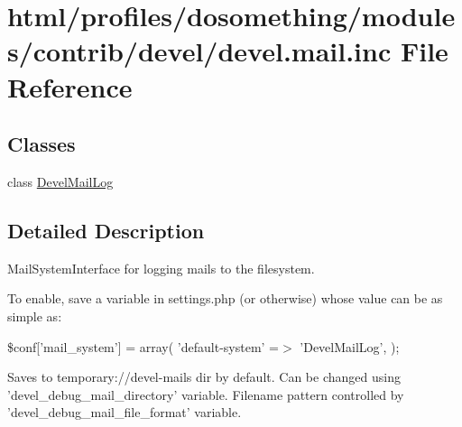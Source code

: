 \hypertarget{devel_8mail_8inc}{
\section{html/profiles/dosomething/modules/contrib/devel/devel.mail.inc File Reference}
\label{devel_8mail_8inc}
}
\subsection*{Classes}
\begin{DoxyCompactItemize}
\item 
class \hyperlink{classDevelMailLog}{DevelMailLog}
\end{DoxyCompactItemize}


\subsection{Detailed Description}
MailSystemInterface for logging mails to the filesystem.

To enable, save a variable in settings.php (or otherwise) whose value can be as simple as:

\$conf\mbox{[}'mail\_\-system'\mbox{]} = array( 'default-\/system' =$>$ 'DevelMailLog', );

Saves to temporary://devel-\/mails dir by default. Can be changed using 'devel\_\-debug\_\-mail\_\-directory' variable. Filename pattern controlled by 'devel\_\-debug\_\-mail\_\-file\_\-format' variable. 